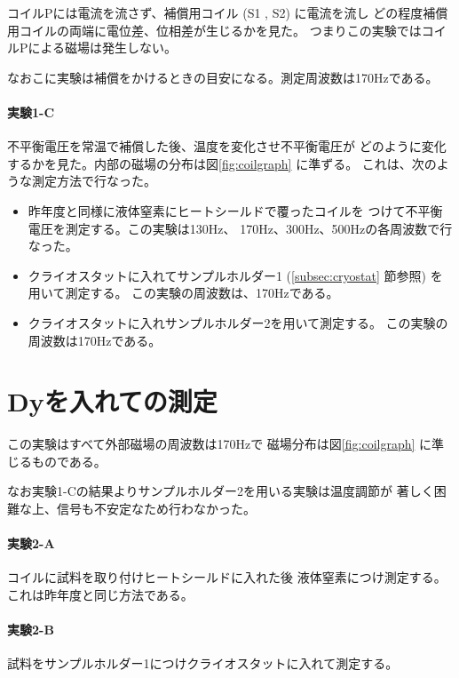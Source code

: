 コイルPには電流を流さず、補償用コイル (S1 , S2) に電流を流し
どの程度補償用コイルの両端に電位差、位相差が生じるかを見た。
つまりこの実験ではコイルPによる磁場は発生しない。

なおこに実験は補償をかけるときの目安になる。測定周波数は170Hzである。

\paragraph{実験1-C}

不平衡電圧を常温で補償した後、温度を変化させ不平衡電圧が
どのように変化するかを見た。内部の磁場の分布は図\ref{fig:coilgraph}
に準ずる。
これは、次のような測定方法で行なった。
	\begin{itemize}
		\item 昨年度と同様に液体窒素にヒートシールドで覆ったコイルを
		つけて不平衡電圧を測定する。この実験は130Hz、
		170Hz、300Hz、500Hzの各周波数で行なった。
		\item クライオスタットに入れてサンプルホルダー1
		(\ref{subsec:cryostat} 節参照) を用いて測定する。
		この実験の周波数は、170Hzである。 
		\item クライオスタットに入れサンプルホルダー2を用いて測定する。
		この実験の周波数は170Hzである。
	\end{itemize}

\section{Dyを入れての測定}\label{sec:Dymeasure}

この実験はすべて外部磁場の周波数は170Hzで
磁場分布は図\ref{fig:coilgraph} に準じるものである。

なお実験1-Cの結果よりサンプルホルダー2を用いる実験は温度調節が
著しく困難な上、信号も不安定なため行わなかった。

\paragraph{実験2-A}

コイルに試料を取り付けヒートシールドに入れた後
液体窒素につけ測定する。これは昨年度と同じ方法である。

\paragraph{実験2-B} 

試料をサンプルホルダー1につけクライオスタットに入れて測定する。



